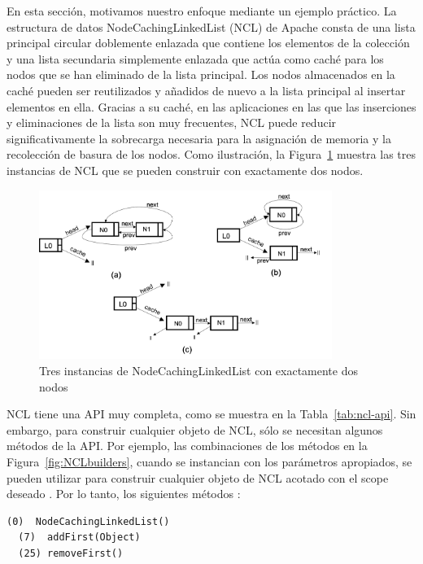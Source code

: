 En esta sección, motivamos nuestro enfoque mediante un ejemplo práctico. La estructura de datos NodeCachingLinkedList (NCL) de Apache \cite{apache} consta de una lista principal circular doblemente enlazada  que contiene los elementos de la colección y una lista secundaria simplemente enlazada que actúa como caché para los nodos que se han eliminado de la lista principal. Los nodos almacenados en la caché pueden ser reutilizados y añadidos de nuevo a la lista principal al insertar elementos en ella. Gracias a su caché, en las aplicaciones en las que las inserciones y eliminaciones de la lista son muy frecuentes, NCL puede reducir significativamente la sobrecarga necesaria para la asignación de memoria y la recolección de basura de los nodos. 
Como ilustración, la Figura~\ref{fig:ncl-instances} muestra las tres instancias de NCL que se pueden construir con exactamente dos nodos.


\begin{figure}[H]
    \centering
    \includegraphics[width=0.85\textwidth]{NCL-instances.png}
    \caption{Tres instancias de NodeCachingLinkedList con exactamente dos nodos}
    \label{fig:ncl-instances}
\end{figure}


NCL tiene una API muy completa, como se muestra en la Tabla~\ref{tab:ncl-api}.
Sin embargo, para construir cualquier objeto de NCL, sólo se necesitan algunos
métodos de la API. Por ejemplo, las combinaciones de los métodos en la
Figura~\ref{fig:NCLbuilders}, cuando se instancian con los parámetros
apropiados, se pueden utilizar para construir cualquier objeto de NCL acotado
con el scope deseado .
Por lo tanto, los siguientes métodos :
\\
\begin{lstlisting}[numbers=none,label=fig:NCLbuilders, caption=Conjunto de metodos sufiente para NCL]
  (0)  NodeCachingLinkedList()
  (7)  addFirst(Object)
  (25) removeFirst()
\end{lstlisting}

